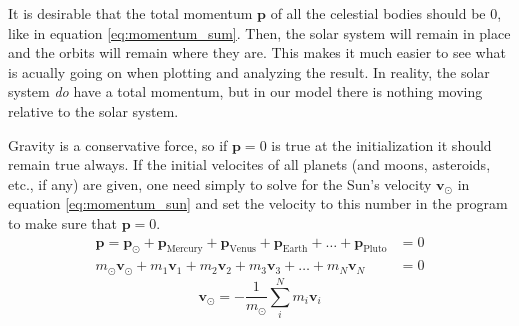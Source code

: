 %
%
%
%
%


It is desirable that the total momentum $\mathbf{p}$ of all the celestial bodies should be $0$, like in equation \ref{eq:momentum_sum}. Then, the solar system will remain in place and the orbits will remain where they are. This makes it much easier to see what is acually going on when plotting and analyzing the result. In reality, the solar system \emph{do} have a total momentum, but in our model there is nothing moving relative to the solar system.

Gravity is a conservative force, so if $\mathbf{p} = 0$ is true at the initialization it should remain true always. If the initial velocites of all planets (and moons, asteroids, etc., if any) are given, one need simply to solve for the Sun's velocity $\mathbf{v}_\odot$ in equation \ref{eq:momentum_sun} and set the velocity to this number in the program to make sure that $\mathbf{p} = 0$.
\begin{align}
	\label{eq:momentum_sum}
	\mathbf{p} =
	\mathbf{p}_\odot
	+ \mathbf{p}_\textrm{Mercury}
	+ \mathbf{p}_\textrm{Venus}
	+ \mathbf{p}_\textrm{Earth}
	+ \dots
	+ \mathbf{p}_\textrm{Pluto}
	&= 0 \\
	\label{eq:momentum_sun}
	m_\odot \mathbf{v}_\odot
	+ m_1 \mathbf{v}_1
	+ m_2 \mathbf{v}_2
	+ m_3 \mathbf{v}_3
	+ \dots
	+ m_N \mathbf{v}_N
	&= 0
\end{align}
$$
	\mathbf{v}_\odot = - \frac{1}{m_\odot} \sum_i^N m_i \mathbf{v}_i
$$
